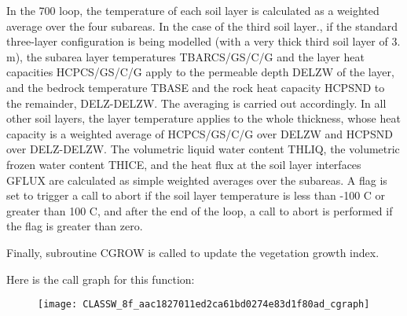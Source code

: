 In the 700 loop, the temperature of each soil layer is calculated as a weighted average over the four subareas. In the case of the third soil layer., if the standard three-\/layer configuration is being modelled (with a very thick third soil layer of 3. m), the subarea layer temperatures T\+B\+A\+R\+C\+S/\+G\+S/\+C/\+G and the layer heat capacities H\+C\+P\+C\+S/\+G\+S/\+C/\+G apply to the permeable depth D\+E\+L\+Z\+W of the layer, and the bedrock temperature T\+B\+A\+S\+E and the rock heat capacity H\+C\+P\+S\+N\+D to the remainder, D\+E\+L\+Z-\/\+D\+E\+L\+Z\+W. The averaging is carried out accordingly. In all other soil layers, the layer temperature applies to the whole thickness, whose heat capacity is a weighted average of H\+C\+P\+C\+S/\+G\+S/\+C/\+G over D\+E\+L\+Z\+W and H\+C\+P\+S\+N\+D over D\+E\+L\+Z-\/\+D\+E\+L\+Z\+W. The volumetric liquid water content T\+H\+L\+I\+Q, the volumetric frozen water content T\+H\+I\+C\+E, and the heat flux at the soil layer interfaces G\+F\+L\+U\+X are calculated as simple weighted averages over the subareas. A flag is set to trigger a call to abort if the soil layer temperature is less than -\/100 C or greater than 100 C, and after the end of the loop, a call to abort is performed if the flag is greater than zero.

Finally, subroutine C\+G\+R\+O\+W is called to update the vegetation growth index.

Here is the call graph for this function\+:\nopagebreak
\begin{figure}[H]
\begin{center}
\leavevmode
\texttt{[image: CLASSW\_8f\_aac1827011ed2ca61bd0274e83d1f80ad\_cgraph]}
\end{center}
\end{figure}


